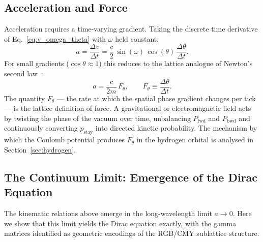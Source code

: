 \subsection{Acceleration and Force}
\label{subsec:force}

Acceleration requires a time-varying gradient.  Taking the discrete
time derivative of Eq.~\eqref{eq:v_omega_theta} with $\omega$ held
constant:
\begin{equation}
    a = \frac{\Delta v}{\Delta t}
      = \frac{c}{2}\,\sin(\omega)\,\cos(\theta)\,\frac{\Delta\theta}{\Delta t}.
    \label{eq:acceleration}
\end{equation}
For small gradients ($\cos\theta \approx 1$) this reduces to the
lattice analogue of Newton's second law~\cite{newton1687}:
\begin{equation}
    a = \frac{c}{2m}\,F_\theta,
    \qquad
    F_\theta \equiv \frac{\Delta\theta}{\Delta t}.
    \label{eq:newton}
\end{equation}
The quantity $F_\theta$ — the rate at which the spatial phase gradient
changes per tick — is the lattice definition of force.  A gravitational
or electromagnetic field acts by twisting the phase of the vacuum over
time, unbalancing $P_\mathrm{fwd}$ and $P_\mathrm{bwd}$ and
continuously converting $p_\mathrm{stay}$ into directed kinetic
probability.  The mechanism by which the Coulomb potential produces
$F_\theta$ in the hydrogen orbital is analysed in
Section~\ref{sec:hydrogen}.

\subsection{The Continuum Limit: Emergence of the Dirac Equation}
\label{subsec:dirac_limit}

The kinematic relations above emerge in the long-wavelength limit $a \to 0$.
Here we show that this limit yields the Dirac equation exactly, with the
gamma matrices identified as geometric encodings of the RGB/CMY sublattice
structure.


